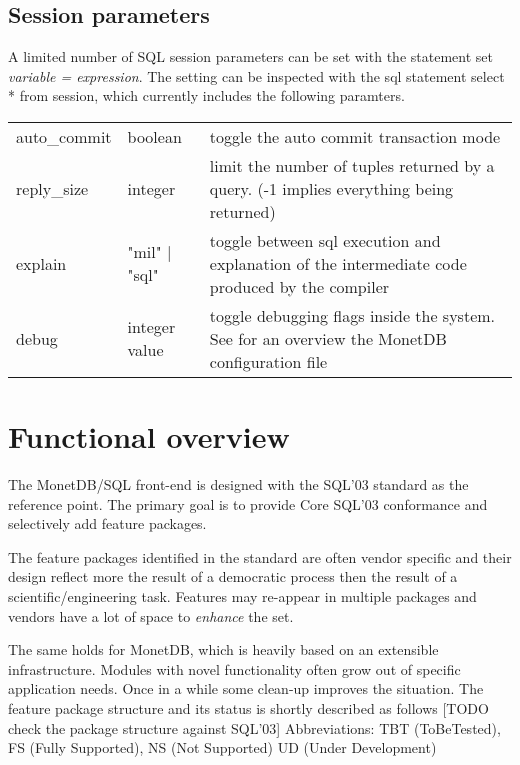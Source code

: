 \documentclass[10pt,twocolumn,fleqn]{article}
\begin{document}
\subsection*{Session parameters}
A limited number of SQL session parameters can be set with the
statement {\sc set} {\em variable = expression}.
The setting can be inspected with the {\sc sql} statement
{\sc select} * {\sc from} session, which currently includes
the following paramters.
\begin{tabular}{ll l}
auto\_commit & boolean & toggle the auto commit transaction mode\\
reply\_size & integer & limit the number of tuples returned by a query. (-1 implies everything being returned)\\
explain & "mil" | "sql" & toggle between {\sc sql} execution and
explanation of the intermediate code produced by the compiler\\
debug & integer value & toggle debugging flags inside the system. 
See for an overview the MonetDB configuration file\\
\end{tabular}

\section{Functional overview}
\label{Functionality}
The MonetDB/SQL front-end is designed with the SQL'03 standard as the reference
point. The primary goal is to provide Core SQL'03 conformance and
selectively add feature packages.

The feature packages identified in the standard are often vendor specific
and their design reflect more the result of a democratic process then
the result of a scientific/engineering task.
Features may re-appear in multiple packages and vendors have a lot of
space to {\em enhance} the set.

The same holds for MonetDB, which is heavily based on an extensible 
infrastructure. Modules with novel functionality often grow out of
specific application needs. Once in a while some clean-up improves
the situation.
The feature package structure and its status is shortly described as follows
[TODO check the package structure against SQL'03]
Abbreviations: TBT (ToBeTested), FS  (Fully Supported), NS (Not Supported)
UD (Under Development)
\end{document}
